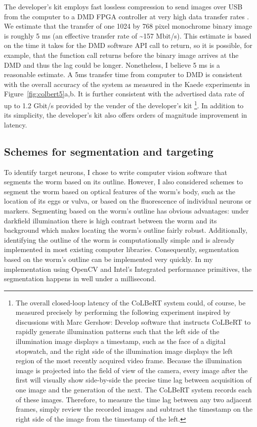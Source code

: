 The developer's kit employs fast lossless compression to send images over USB from the computer to a DMD FPGA controller at very high data transfer rates 
\citep{vialux_vialux_2009}. We estimate that the transfer of one 1024 by 768 pixel monochrome binary image is roughly 5 ms (an effective transfer rate of \textasciitilde157 Mbit/s). This estimate is based on the time it takes for the DMD software API call to return, so it is possible, for example, that the function call returns before the binary image arrives at the DMD and thus the lag could be longer. Nonetheless, I believe 5 ms is a reasonable estimate. A 5ms transfer time from computer to DMD is consistent with the overall accuracy of the system as measured in the Kaede experiments in Figure~\ref{fig:colbert5}a,b. It is further consistent with the advertised data rate of up to 1.2 Gbit/s provided by the vender of the developer's kit \citep{vialux_vialux_2009}\footnote{The overall closed-loop latency of the CoLBeRT system could, of course, be measured precisely by performing the following experiment inspired by discussions with Marc Gershow: Develop software that instructs CoLBeRT to rapidly generate illumination patterns such that the left side of the illumination image displays a timestamp, such as the face of a digital stopwatch, and the right side of the illumination image displays the left region of the most recently acquired video frame. Because the illumination image is projected into the field of view of the camera, every image after the first will visually show side-by-side  the precise time lag between acquisition of one image and the generation of the next. The CoLBeRT system records each of these images. Therefore, to measure the time lag between any two adjacent frames, simply review the recorded images and subtract the timestamp on the right side of the image from the timestamp of the left.}. In addition to its simplicity, the developer's kit also offers orders of magnitude improvement in latency. 

\subsection{Schemes for segmentation and targeting}
To identify target neurons, I chose to write computer vision software that segments the worm based on its outline. However, I also considered schemes to segment the worm based on optical features of the worm's body, such as the location of its eggs or vulva,  or based on the fluorescence of individual neurons or markers. Segmenting based on the worm's outline has obvious advantages: under darkfield illumination there is high contrast between the worm and its background which makes locating the worm's outline fairly robust. Additionally, identifying the outline of the worm is computationally simple and is already implemented in most existing computer libraries. Consequently, segmentation based on the worm's outline can be implemented very quickly. In my implementation using OpenCV and Intel's Integrated performance primitives, the segmentation happens in well under a millisecond.

